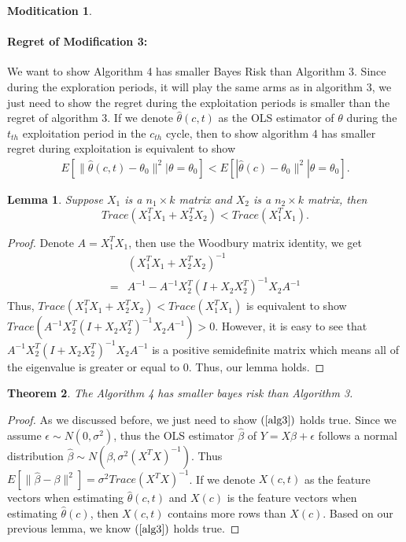 \documentclass{article}
\newtheorem{theorem}{Theorem}
\newtheorem{lemma}[theorem]{Lemma}
\theoremstyle{plain}
\theoremstyle{definition}
\newtheorem{modification}{Moditication}
\begin{document}
\begin{modification}
\paragraph{Regret of Modification 3:}
We want to show Algorithm 4 has smaller Bayes Risk than Algorithm 3. Since during the exploration periods, it will play the same arms as in algorithm 3, we just need to show the regret during the exploitation periods is smaller than the regret of algorithm 3. If we denote $\hat{\theta}(c,t)$ as the OLS estimator of $\theta$ during the $t_{th}$ exploitation period in the $c_{th}$ cycle, then to show algorithm 4 has smaller regret during exploitation is equivalent to show 
\begin{align}
E[\|\hat{\theta}(c,t)-\theta_{0}\|^{2}|\theta=\theta_{0}] < E[|\hat{\theta}(c)-\theta_{0}\|^{2}|\theta=\theta_{0}]. \label{alg3}
\end{align}
\begin{lemma}
Suppose $X_{1}$ is a $n_{1}\times k $ matrix and $X_{2}$ is a $n_{2}\times k$ matrix, then
\begin{equation}
Trace(X_{1}^{T}X_{1}+X_{2}^{T}X_{2}) < Trace(X_{1}^{T}X_{1}). \nonumber
\end{equation}
\end{lemma}
\begin{proof}
Denote $A=X_{1}^{T}X_{1}$, then use the Woodbury matrix identity, we get
\begin{align}
&(X_{1}^{T}X_{1}+X_{2}^{T}X_{2})^{-1} \nonumber \\
=& A^{-1}-A^{-1}X_{2}^{T}(I+X_{2}X_{2}^{T})^{-1}X_{2}A^{-1} \nonumber 
\end{align}
Thus, $Trace(X_{1}^{T}X_{1}+X_{2}^{T}X_{2}) < Trace(X_{1}^{T}X_{1})$ is equivalent to show $Trace(A^{-1}X_{2}^{T}(I+X_{2}X_{2}^{T})^{-1}X_{2}A^{-1})>0$. However, it is easy to see that $A^{-1}X_{2}^{T}(I+X_{2}X_{2}^{T})^{-1}X_{2}A^{-1}$ is a positive semidefinite matrix which means all of the eigenvalue is greater or equal to 0. Thus, our lemma holds.
\end{proof}

\begin{theorem}
The Algorithm 4 has smaller bayes risk than Algorithm 3.
\end{theorem}
\begin{proof}
As we discussed before, we just need to show $(\ref{alg3})$ holds true. Since we assume $\epsilon\sim N(0,\sigma^{2})$, thus the OLS estimator $\hat{\beta}$ of $Y=X\beta+\epsilon$ follows a normal distribution $\hat{\beta}\sim N(\beta,\sigma^{2}(X^{T}X)^{-1})$. Thus $E[\|\hat{\beta}-\beta\|^{2}]=\sigma^{2}Trace(X^{T}X)^{-1}$. If we denote $X(c,t)$ as the feature vectors when estimating $\hat{\theta}(c,t)$ and $X(c)$ is the feature vectors when estimating $\hat{\theta}(c)$, then $X(c,t)$ contains more rows than $X(c)$. Based on our previous lemma, we know $(\ref{alg3})$ holds true.
\end{proof}


\end{modification}
\end{document}

